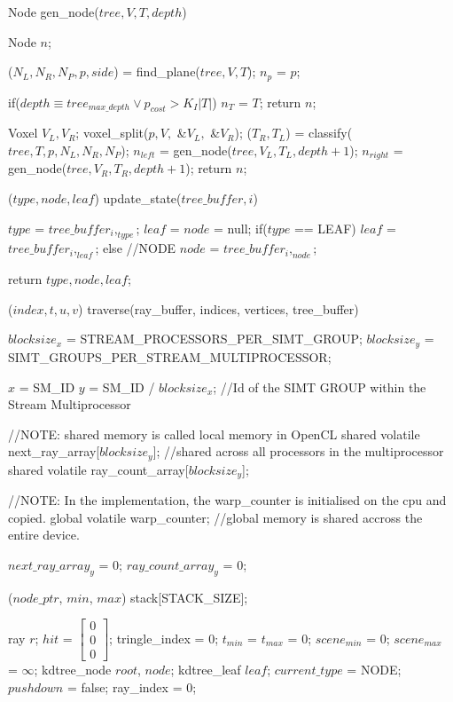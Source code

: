 \documentclass[12pt,letterpaper]{article}
\begin{document}
\newpage
\begin{algorithm}[caption={GenerateTree.}, label={alg1}]
  Node gen_node($tree, V, T, depth$)
  {
    Node $n$;

    ($N_L, N_R, N_P, p, side$) = find_plane($tree, V, T$);
    $n_p$ = $p$;

    if($depth \equiv tree_{max\_depth} \lor p_{cost} > K_I|T|$)
    {
      $n_T$ = $T$;
      return $n$;
    }

    Voxel $V_L, V_R$;
    voxel_split($p, V,$ &$V_L,$ &$V_R$);
    ($T_R, T_L$) = classify($tree, T, p, N_L, N_R, N_P$);
    $n_{left}$ = gen_node($tree, V_L, T_L, depth+1$);
    $n_{right}$ = gen_node($tree, V_R, T_R, depth+1$);
    return $n$;
  }
\end{algorithm}
\newpage
\begin{algorithm}[caption={Persistent Short Stack K-D Tree Traversal.}, label={alg1}]
  ($type, node, leaf$) update_state($tree\_buffer, i$)
  {
    $type$ = $tree\_buffer_i,_{type}$;
    $leaf$ = $node$ = null;
    if($type$ == LEAF)
    {
      $leaf$ = $tree\_buffer_i,_{leaf}$;
    }
    else //NODE
    {
      $node$ = $tree\_buffer_i,_{node}$;
    }

    return {$type, node, leaf$};
  }

  ($index, t, u, v$) traverse(ray_buffer, indices, vertices, tree_buffer)
  {
    $blocksize_x$ = STREAM_PROCESSORS_PER_SIMT_GROUP;
    $blocksize_y$ = SIMT_GROUPS_PER_STREAM_MULTIPROCESSOR;

    $x$ = SM_ID %
    $y$ = SM_ID / $blocksize_x$; //Id of the SIMT GROUP within the Stream Multiprocessor

    //NOTE: shared memory is called local memory in OpenCL
    shared volatile next_ray_array[$blocksize_y$]; //shared across all processors in the multiprocessor 
    shared volatile ray_count_array[$blocksize_y$];

    //NOTE: In the implementation, the warp_counter is initialised on the cpu and copied.
    global volatile warp_counter; //global memory is shared accross the entire device.

    $next\_ray\_array_y$ = 0;
    $ray\_count\_array_y$ = 0;

    ($node\_ptr$, $min$, $max$) stack[STACK_SIZE];

    ray $r$;
    $hit$ = $\begin{bmatrix} 0 \\ 0 \\ 0 \end{bmatrix}$;
    tringle_index = 0;
    $t_{min}$ = $t_{max}$ = 0;
    $scene_{min}$ = 0; $scene_{max}$ = $\infty$;
    kdtree_node $root$, $node$;
    kdtree_leaf $leaf$;
    $current\_type$ = NODE;
    $pushdown$ = false;
    ray_index = 0;

}
\end{algorithm}
\end{document}
